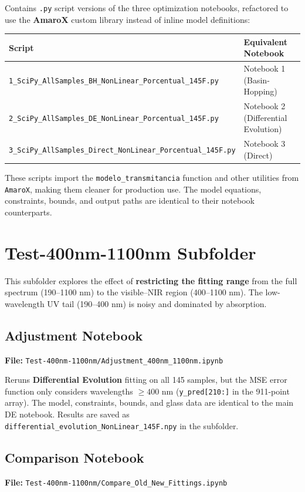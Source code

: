 \documentclass[11pt,a4paper]{article}
\begin{document}
Contains {\tt .py} script versions of the three optimization notebooks, refactored to use the \textbf{AmaroX} custom library instead of inline model definitions:

\begin{table}[htbp]
\centering
\begin{tabular}{ll}
\toprule
\textbf{Script} & \textbf{Equivalent Notebook} \\
\midrule
{\tt 1\_SciPy\_AllSamples\_BH\_NonLinear\_Porcentual\_145F.py} & Notebook 1 (Basin-Hopping) \\
{\tt 2\_SciPy\_AllSamples\_DE\_NonLinear\_Porcentual\_145F.py} & Notebook 2 (Differential Evolution) \\
{\tt 3\_SciPy\_AllSamples\_Direct\_NonLinear\_Porcentual\_145F.py} & Notebook 3 (Direct) \\
\bottomrule
\end{tabular}
\end{table}

These scripts import the {\tt modelo\_transmitancia} function and other utilities from {\tt AmaroX}, making them cleaner for production use. The model equations, constraints, bounds, and output paths are identical to their notebook counterparts.

\section{Test-400nm-1100nm Subfolder}

This subfolder explores the effect of \textbf{restricting the fitting range} from the full spectrum (190--1100 nm) to the visible--NIR region (400--1100 nm). The low-wavelength UV tail (190--400 nm) is noisy and dominated by absorption.

\subsection{Adjustment Notebook}
\textbf{File:} {\tt Test-400nm-1100nm/Adjustment\_400nm\_1100nm.ipynb}

Reruns \textbf{Differential Evolution} fitting on all 145 samples, but the MSE error function only considers wavelengths $\geq 400$ nm ({\tt y\_pred[210:]} in the 911-point array). The model, constraints, bounds, and glass data are identical to the main DE notebook. Results are saved as {\tt differential\_evolution\_NonLinear\_145F.npy} in the subfolder.

\subsection{Comparison Notebook}
\textbf{File:} {\tt Test-400nm-1100nm/Compare\_Old\_New\_Fittings.ipynb}
\end{document}
